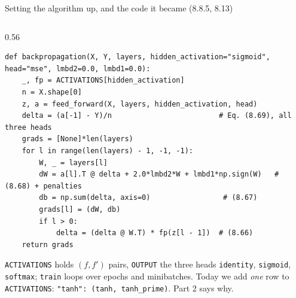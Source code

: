 \documentclass[10pt,aspectratio=169]{beamer}
\begin{document}
\begin{frame}[fragile]{Setting the algorithm up, and the code it became (8.8.5, 8.13)}
\begin{columns}[T]
\begin{column}{0.56\textwidth}
\begin{lstlisting}
def backpropagation(X, Y, layers, hidden_activation="sigmoid", head="mse", lmbd2=0.0, lmbd1=0.0):
    _, fp = ACTIVATIONS[hidden_activation]
    n = X.shape[0]
    z, a = feed_forward(X, layers, hidden_activation, head)
    delta = (a[-1] - Y)/n                         # Eq. (8.69), all three heads
    grads = [None]*len(layers)
    for l in range(len(layers) - 1, -1, -1):
        W, _ = layers[l]
        dW = a[l].T @ delta + 2.0*lmbd2*W + lmbd1*np.sign(W)   # (8.68) + penalties
        db = np.sum(delta, axis=0)                 # (8.67)
        grads[l] = (dW, db)
        if l > 0:
            delta = (delta @ W.T) * fp(z[l - 1])  # (8.66)
    return grads
\end{lstlisting}
\scriptsize
\texttt{ACTIVATIONS} holds $(f,f')$ pairs, \texttt{OUTPUT} the three heads
\texttt{identity}, \texttt{sigmoid}, \texttt{softmax}; \texttt{train} loops
over epochs and minibatches.  Today we add \emph{one} row to
\texttt{ACTIVATIONS}: \texttt{"tanh": (tanh, tanh\_prime)}.  Part 2 says why.
\end{column}
\end{columns}
\end{frame}
\end{document}
